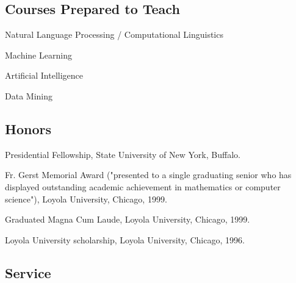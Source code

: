 \documentclass[letterpaper]{article}
\renewenvironment{itemize}{
  \begin{list}{}{
    \setlength{\leftmargin}{1.5em}
  }
}{
  \end{list}
}
\begin{document}
\subsection*{Courses Prepared to Teach}

\begin{itemize}
\item Natural Language Processing / Computational Linguistics
\item Machine Learning
\item Artificial Intelligence
\item Data Mining
\end{itemize}

\subsection*{Honors}
\begin{itemize}
\item Presidential Fellowship, State University of New York, Buffalo.
\item Fr. Gerst Memorial Award ("presented to a single graduating senior who has displayed outstanding academic achievement in mathematics or computer science"), Loyola University, Chicago, 1999.
\item Graduated Magna Cum Laude, Loyola University, Chicago, 1999.
\item Loyola University scholarship, Loyola University, Chicago, 1996.
\end{itemize}

\subsection*{Service}
\end{document}

